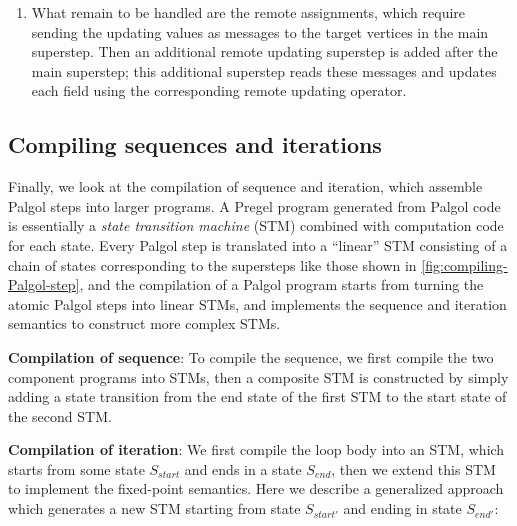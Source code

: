 \documentclass{sokendai_thesis} %
\begin{document}
\begin{enumerate}
\item What remain to be handled are the remote assignments, which require sending the updating values as messages to the target vertices in the main superstep.
Then an additional remote updating superstep is added after the main superstep; this additional superstep reads these messages and updates each field using the corresponding remote updating operator.
\end{enumerate}

\subsection{Compiling sequences and iterations}
\label{sec:trans-iter}

Finally, we look at the compilation of sequence and iteration, which assemble Palgol steps into larger programs.
A Pregel program generated from Palgol code is essentially a \emph{state transition machine} (STM) combined with computation code for each state.
Every Palgol step is translated into a ``linear'' STM consisting of a chain of states corresponding to the supersteps like those shown in \autoref{fig:compiling-Palgol-step},
and the compilation of a Palgol program starts from turning the atomic Palgol steps into linear STMs, and implements the sequence and iteration semantics to construct more complex STMs.

\textbf{Compilation of sequence}:
To compile the sequence, we first compile the two component programs into STMs, then a composite STM is constructed by simply adding a state transition from the end state of the first STM to the start state of the second STM.

\textbf{Compilation of iteration}:
We first compile the loop body into an STM, which starts from some state $S_\mathit{start}$ and ends in a state $S_\mathit{end}$, then we extend this STM to implement the fixed-point semantics.
Here we describe a generalized approach which generates a new STM starting from state $S_\mathit{start'}$ and ending in state $S_\mathit{end'}$:
\end{document}
